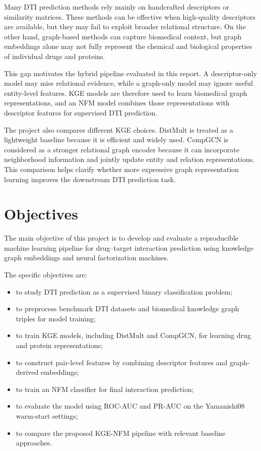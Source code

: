 Many DTI prediction methods rely mainly on handcrafted descriptors or similarity
matrices. These methods can be effective when high-quality descriptors are
available, but they may fail to exploit broader relational structure. On the
other hand, graph-based methods can capture biomedical context, but graph
embeddings alone may not fully represent the chemical and biological properties
of individual drugs and proteins.

This gap motivates the hybrid pipeline evaluated in this report. A
descriptor-only model may miss relational evidence, while a graph-only model may
ignore useful entity-level features. KGE models are therefore used to learn
biomedical graph representations, and an NFM model combines those
representations with descriptor features for supervised DTI prediction.

The project also compares different KGE choices. DistMult is treated as a
lightweight baseline because it is efficient and widely used. CompGCN is
considered as a stronger relational graph encoder because it can incorporate
neighborhood information and jointly update entity and relation representations.
This comparison helps clarify whether more expressive graph representation
learning improves the downstream DTI prediction task.

\section{Objectives}

The main objective of this project is to develop and evaluate a reproducible
machine learning pipeline for drug--target interaction prediction using
knowledge graph embeddings and neural factorization machines.

The specific objectives are:

\begin{itemize}
    \item to study DTI prediction as a supervised binary classification problem;

    \item to preprocess benchmark DTI datasets and biomedical knowledge graph
    triples for model training;

    \item to train KGE models, including DistMult and CompGCN, for learning
    drug and protein representations;

    \item to construct pair-level features by combining descriptor features and
    graph-derived embeddings;

    \item to train an NFM classifier for final interaction prediction;

    \item to evaluate the model using ROC-AUC and PR-AUC on the Yamanishi08
    warm-start settings;

    \item to compare the proposed KGE-NFM pipeline with relevant baseline
    approaches.
\end{itemize}

